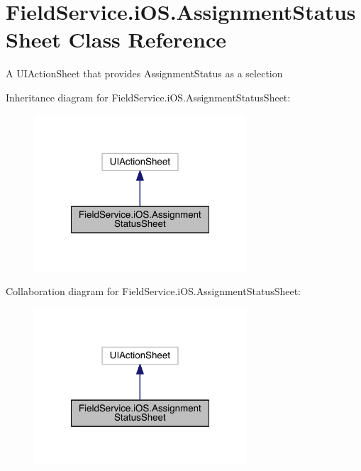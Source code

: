 \hypertarget{class_field_service_1_1i_o_s_1_1_assignment_status_sheet}{\section{Field\+Service.\+i\+O\+S.\+Assignment\+Status\+Sheet Class Reference}
\label{class_field_service_1_1i_o_s_1_1_assignment_status_sheet}
}


A U\+I\+Action\+Sheet that provides Assignment\+Status as a selection  




Inheritance diagram for Field\+Service.\+i\+O\+S.\+Assignment\+Status\+Sheet\+:
\nopagebreak
\begin{figure}[H]
\begin{center}
\leavevmode
\includegraphics[width=224pt]{class_field_service_1_1i_o_s_1_1_assignment_status_sheet__inherit__graph}
\end{center}
\end{figure}


Collaboration diagram for Field\+Service.\+i\+O\+S.\+Assignment\+Status\+Sheet\+:
\nopagebreak
\begin{figure}[H]
\begin{center}
\leavevmode
\includegraphics[width=224pt]{class_field_service_1_1i_o_s_1_1_assignment_status_sheet__coll__graph}
\end{center}
\end{figure}
